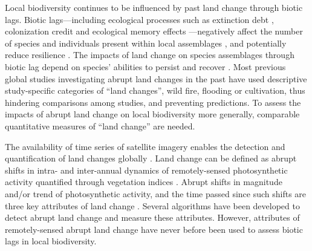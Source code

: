 Local biodiversity continues to be influenced by past land change through biotic lags. Biotic lags—including ecological processes such as extinction debt \citep{Tilman1994,Kuussaari2009,Halley2016}, colonization credit \citep{Hylander2013} and ecological memory effects \citep{Ogle2015}—negatively affect the number of species and individuals present within local assemblages \citep{Halley2016,Jung2018,Perring2018}, and potentially reduce resilience \citep{Hautier2015,Nimmo2015}. The impacts of land change on species assemblages through biotic lag depend on species’ abilities to persist \citep{Turner1998} and recover \citep{Martin2013,Fu2017,Moreno-Mateos2017}. Most previous global studies \citep{Supp2014,Fu2017,Moreno-Mateos2017,Shackelford2017} investigating abrupt land changes in the past have used descriptive study-specific categories of “land changes”, \eg wild fire, flooding or cultivation, thus hindering comparisons among studies, and preventing predictions. To assess the impacts of abrupt land change on local biodiversity more generally, comparable quantitative measures of “land change” are needed.

The availability of time series of satellite imagery enables the detection and quantification of land changes globally \citep{Kennedy2014,Song2018}. Land change can be defined as abrupt shifts in intra- and inter-annual dynamics of remotely-sensed photosynthetic activity quantified through vegetation indices \citep{Linderman2005,Pettorelli2005}. Abrupt shifts in magnitude \citep{Kennedy2012,Watson2014,DeVries2015b} and/or trend \citep{dejong2013} of photosynthetic activity, and the time passed since such shifts \citep{POTTER2003,Kennedy2012} are three key attributes of land change \citep{Watson2014}. Several algorithms have been developed to detect abrupt land change \citep{Zhu2017} and measure these attributes. However, attributes of remotely-sensed abrupt land change have never before been used to assess biotic lags in local biodiversity.

